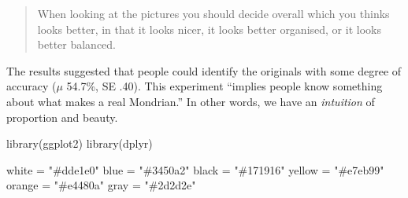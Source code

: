 \documentclass[
  letterpaper,
  DIV=11,
  numbers=noendperiod]{scrreprt}
\newenvironment{Shaded}{\begin{snugshade}}{\end{snugshade}}
\newcommand{\FunctionTok}[1]{\textcolor[rgb]{0.28,0.35,0.67}{#1}}
\newcommand{\NormalTok}[1]{\textcolor[rgb]{0.00,0.23,0.31}{#1}}
\newcommand{\OtherTok}[1]{\textcolor[rgb]{0.00,0.23,0.31}{#1}}
\newcommand{\StringTok}[1]{\textcolor[rgb]{0.13,0.47,0.30}{#1}}
\begin{document}
\begin{quote}
When looking at the pictures you should decide overall which you thinks
looks better, in that it looks nicer, it looks better organised, or it
looks better balanced.
\end{quote}

The results suggested that people could identify the originals with some
degree of accuracy (\(\mu\) 54.7\%, SE .40). This experiment ``implies
people know something about what makes a real Mondrian.'' In other
words, we have an \emph{intuition} of proportion and beauty.

\begin{Shaded}
\begin{Highlighting}[]
\FunctionTok{library}\NormalTok{(ggplot2)}
\FunctionTok{library}\NormalTok{(dplyr)}

\NormalTok{white }\OtherTok{=} \StringTok{"\#dde1e0"}
\NormalTok{blue }\OtherTok{=} \StringTok{"\#3450a2"}
\NormalTok{black }\OtherTok{=} \StringTok{"\#171916"}
\NormalTok{yellow }\OtherTok{=} \StringTok{"\#e7eb99"}
\NormalTok{orange }\OtherTok{=} \StringTok{"\#e4480a"}
\NormalTok{gray }\OtherTok{=} \StringTok{"\#2d2d2e"}


\end{Highlighting}
\end{Shaded}
\end{document}

